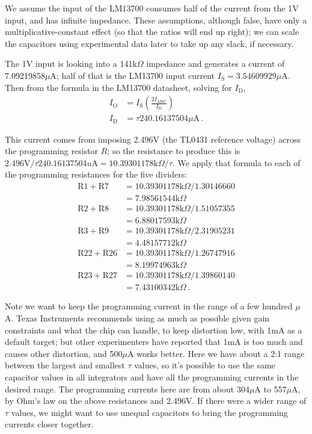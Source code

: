 We assume the input of the LM13700 consumes half of the current from the 1V
input, and has infinite impedance.  These assumptions,
although false, have only a multiplicative-constant effect (so that the
ratios will end up right); we can scale the capacitors using experimental
data later to take up any slack, if necessary.

The 1V input is looking into a 141k$\Omega$ impedance and generates a
current of 7.09219858$\mu$A; half of that is the LM13700 input current
$I_\textrm{S}=3.54609929\mu$A.  Then from the formula in the LM13700
datasheet, solving for $I_\textrm{D}$,
\begin{align*}
  I_\textrm{O}
    &= I_\textrm{S}\left(\frac{2I_\textrm{ABC}}{I_\textrm{D}}\right) \\
  I_\textrm{D} &= \tau240.16137504\mu\textrm{A} \, .
\end{align*}

This current comes from imposing 2.496V (the TL0431 reference voltage)
across the programming resistor $R$; so the resistance to produce this is
$2.496\textrm{V}/\tau240.16137504u\textrm{A} =
10.39301178\textrm{k}\Omega/\tau$.  We apply that formula to each of the
programming resistances for the five dividers:
\begin{align*}
  \textrm{R}1+\textrm{R}7 &= 10.39301178\textrm{k}\Omega/1.30146660 \\
    &= 7.98561544\textrm{k}\Omega \\
  \textrm{R}2+\textrm{R}8 &= 10.39301178\textrm{k}\Omega/1.51057355 \\
    &= 6.88017593\textrm{k}\Omega \\
  \textrm{R}3+\textrm{R}9 &= 10.39301178\textrm{k}\Omega/2.31905231 \\
    &= 4.48157712\textrm{k}\Omega \\
  \textrm{R}22+\textrm{R}26 &= 10.39301178\textrm{k}\Omega/1.26747916 \\
    &= 8.19974963\textrm{k}\Omega \\
  \textrm{R}23+\textrm{R}27 &= 10.39301178\textrm{k}\Omega/1.39860140 \\
    &= 7.43100342\textrm{k}\Omega \, .
\end{align*}

Note we want to keep the programming current in the range of a few hundred
$\mu$A.  Texas Instruments recommends using as much as possible given gain
constraints and what the chip can handle, to keep distortion low, with 1mA
as a default target; but other experimenters have reported that 1mA is too
much and causes other distortion, and 500$\mu$A works better.  Here we have
about a 2:1 range between the largest and smallest $\tau$ values, so it's
possible to use the same capacitor values in all integrators and have all
the programming currents in the desired range.  The programming currents
here are from about 304$\mu$A to 557$\mu$A, by Ohm's law on the above
resistances and 2.496V.  If there were a wider range of $\tau$ values, we
might want to use unequal capacitors to bring the programming currents
closer together.

